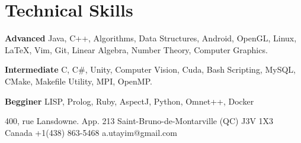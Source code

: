 \documentclass{tccv}
\begin{document}
\section{Technical Skills}

    {\textbf{Advanced}\break
    Java, C++, Algorithms, Data Structures, Android, OpenGL, Linux, \LaTeX, Vim, Git, Linear Algebra, Number Theory, Computer Graphics.
    \hfill\break


    \textbf{Intermediate}\break
    C, C\#, Unity, Computer Vision,  Cuda, Bash Scripting, MySQL, CMake, Makefile Utility, MPI, OpenMP.
    \hfill\break

    \textbf{Begginer}\break
    LISP, Prolog, Ruby, AspectJ, Python, Omnet++, Docker}


\personal
    {400, rue Lansdowne. App. 213\hfill\break 
     Saint-Bruno-de-Montarville (QC) J3V 1X3\hfill\break
    Canada}
    {+1(438) 863-5468}
    {a.utayim@gmail.com}
    
    
    
\end{document}
